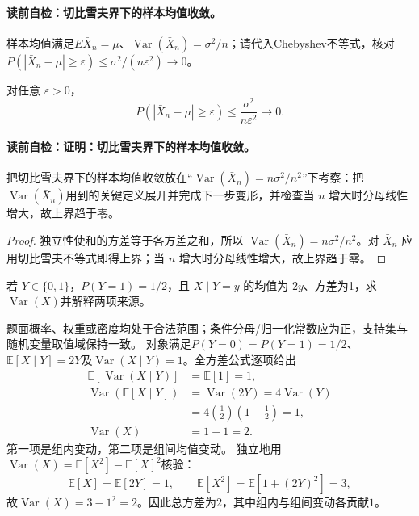 \label{struct:V1-C04-CH14}
\paragraph{读前自检：切比雪夫界下的样本均值收敛。}样本均值满足$E\bar X_n=\mu$、$\operatorname{Var}(\bar X_n)=\sigma^2/n$；请代入Chebyshev不等式，核对$P(|\bar X_n-\mu|\ge\varepsilon)\le\sigma^2/(n\varepsilon^2)\to0$。\par

\begin{corollary}[切比雪夫界下的样本均值收敛]
对任意 $\varepsilon>0$，
\[
P(|\bar X_n-\mu|\ge\varepsilon)\le\frac{\sigma^2}{n\varepsilon^2}\longrightarrow0.
\]
\end{corollary}
\paragraph{读前自检：证明：切比雪夫界下的样本均值收敛。}把切比雪夫界下的样本均值收敛放在“$\operatorname{Var}(\bar X_n)=n\sigma^2/n^2$”下考察：把$\operatorname{Var}(\bar X_n)$用到的关键定义展开并完成下一步变形，并检查当 $n$ 增大时分母线性增大，故上界趋于零。\par

\begin{proof}
独立性使和的方差等于各方差之和，所以 $\operatorname{Var}(\bar X_n)=n\sigma^2/n^2$。对 $\bar X_n$ 应用切比雪夫不等式即得上界；当 $n$ 增大时分母线性增大，故上界趋于零。
\end{proof}
\begin{example}[方差分解]\label{exm:V1-C04-total-variance}
若 $Y\in\{0,1\}$，$P(Y=1)=1/2$，且 $X\mid Y=y$ 的均值为 $2y$、方差为1，求$\operatorname{Var}(X)$并解释两项来源。
\end{example}
\begin{solution}
\SolGiven 题面概率、权重或密度均处于合法范围；条件分母/归一化常数应为正，支持集与随机变量取值域保持一致。
\SolDerive
对象满足$P(Y=0)=P(Y=1)=1/2$、$\mathbb E[X\mid Y]=2Y$及$\operatorname{Var}(X\mid Y)=1$。全方差公式逐项给出
\[
\begin{aligned}
\mathbb E[\operatorname{Var}(X\mid Y)]&=\mathbb E[1]=1,\\
\operatorname{Var}(\mathbb E[X\mid Y])
&=\operatorname{Var}(2Y)=4\operatorname{Var}(Y)\\
&=4\left(\frac12\right)\left(1-\frac12\right)=1,\\
\operatorname{Var}(X)&=1+1=2.
\end{aligned}
\]
第一项是组内变动，第二项是组间均值变动。
独立地用$\operatorname{Var}(X)=\mathbb E[X^2]-\mathbb E[X]^2$核验：
\[
\mathbb E[X]=\mathbb E[2Y]=1,
\qquad
\mathbb E[X^2]=\mathbb E[1+(2Y)^2]=3,
\]
故$\operatorname{Var}(X)=3-1^2=2$。因此总方差为$2$，其中组内与组间变动各贡献$1$。
\end{solution}


